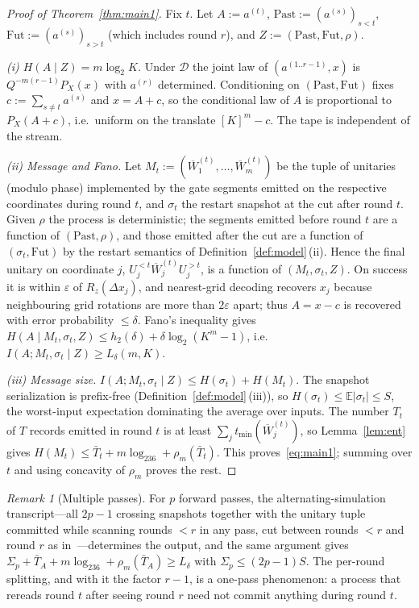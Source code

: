 \documentclass[aps,prx,twocolumn,superscriptaddress,nofootinbib,longbibliography]{revtex4-2}
\theoremstyle{plain}
\theoremstyle{definition}
\theoremstyle{remark}
\newtheorem{remark}{Remark}
\newcommand{\E}{\mathbb{E}}
\begin{document}
\begin{proof}[Proof of Theorem~\ref{thm:main1}]
Fix $t$. Let $A:=a^{(t)}$, $\mathrm{Past}:=(a^{(s)})_{s<t}$, $\mathrm{Fut}:=(a^{(s)})_{s>t}$ (which includes round $r$), and $Z:=(\mathrm{Past},\mathrm{Fut},\rho)$.

\emph{(i) $H(A\mid Z)=m\log_2K$.} Under $\mathcal D$ the joint law of $(a^{(1..r-1)},x)$ is $Q^{-m(r-1)}P_X(x)$ with $a^{(r)}$ determined. Conditioning on $(\mathrm{Past},\mathrm{Fut})$ fixes $c:=\sum_{s\ne t}a^{(s)}$ and $x=A+c$, so the conditional law of $A$ is proportional to $P_X(A+c)$, i.e.\ uniform on the translate $[K]^m-c$. The tape is independent of the stream.

\emph{(ii) Message and Fano.} Let $M_t:=(\overline W^{(t)}_1,\dots,\overline W^{(t)}_m)$ be the tuple of unitaries (modulo phase) implemented by the gate segments emitted on the respective coordinates during round $t$, and $\sigma_t$ the restart snapshot at the cut after round $t$. Given $\rho$ the process is deterministic; the segments emitted before round $t$ are a function of $(\mathrm{Past},\rho)$, and those emitted after the cut are a function of $(\sigma_t,\mathrm{Fut})$ by the restart semantics of Definition~\ref{def:model}\,(ii). Hence the final unitary on coordinate $j$, $U^{<t}_j\overline W^{(t)}_jU^{>t}_j$, is a function of $(M_t,\sigma_t,Z)$. On success it is within $\varepsilon$ of $R_z(\Delta x_j)$, and nearest-grid decoding recovers $x_j$ because neighbouring grid rotations are more than $2\varepsilon$ apart; thus $A=x-c$ is recovered with error probability $\le\delta$. Fano's inequality gives $H(A\mid M_t,\sigma_t,Z)\le h_2(\delta)+\delta\log_2(K^m-1)$, i.e.\ $I(A;M_t,\sigma_t\mid Z)\ge L_\delta(m,K)$.

\emph{(iii) Message size.} $I(A;M_t,\sigma_t\mid Z)\le H(\sigma_t)+H(M_t)$. The snapshot serialization is prefix-free (Definition~\ref{def:model}\,(iii)), so $H(\sigma_t)\le\E|\sigma_t|\le S$, the worst-input expectation dominating the average over inputs. The number $T_t$ of $T$ records emitted in round $t$ is at least $\sum_jt_{\min}(\overline W^{(t)}_j)$, so Lemma~\ref{lem:ent} gives $H(M_t)\le\bar T_t+m\log_236+\rho_m(\bar T_t)$. This proves~\eqref{eq:main1}; summing over $t$ and using concavity of $\rho_m$ proves the rest.
\end{proof}

\begin{remark}[Multiple passes]
For $p$ forward passes, the alternating-simulation transcript---all $2p-1$ crossing snapshots together with the unitary tuple committed while scanning rounds $<r$ in any pass, cut between rounds $<r$ and round $r$ as in~\cite{Paper1}---determines the output, and the same argument gives $\Sigma_p+\bar T_A+m\log_236+\rho_m(\bar T_A)\ge L_\delta$ with $\Sigma_p\le(2p-1)S$. The per-round splitting, and with it the factor $r-1$, is a one-pass phenomenon: a process that rereads round $t$ after seeing round $r$ need not commit anything during round $t$.
\end{remark}
\end{document}
